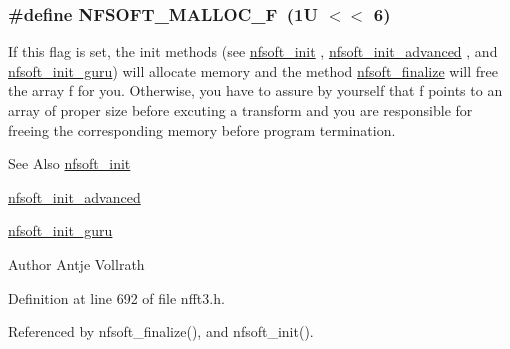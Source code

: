 \hypertarget{group__nfsoft_gac65bdc42b4c11296197dc991bbebbd12}{
\subsubsection[{N\-F\-S\-O\-F\-T\-\_\-\-M\-A\-L\-L\-O\-C\-\_\-\-F}]{\setlength{\rightskip}{0pt plus 5cm}\#define N\-F\-S\-O\-F\-T\-\_\-\-M\-A\-L\-L\-O\-C\-\_\-\-F~(1\-U $<$$<$ 6)}}\label{group__nfsoft_gac65bdc42b4c11296197dc991bbebbd12}
If this flag is set, the init methods (see \hyperlink{group__nfsoft_ga31c884458165fa204073c6c16c10775e}{nfsoft\-\_\-init} , \hyperlink{group__nfsoft_gaf4aec4ee2a2a5d56ca27c4f1a7f90b18}{nfsoft\-\_\-init\-\_\-advanced} , and \hyperlink{group__nfsoft_ga1c13cdd3f82f48fa41acdd313cdc2052}{nfsoft\-\_\-init\-\_\-guru}) will allocate memory and the method \hyperlink{group__nfsoft_ga30b5c6ae1ff496680f11ddcaad2d5a47}{nfsoft\-\_\-finalize} will free the array {\ttfamily f} for you. Otherwise, you have to assure by yourself that {\ttfamily f} points to an array of proper size before excuting a transform and you are responsible for freeing the corresponding memory before program termination.

\begin{DoxySeeAlso}{See Also}
\hyperlink{group__nfsoft_ga31c884458165fa204073c6c16c10775e}{nfsoft\-\_\-init} 

\hyperlink{group__nfsoft_gaf4aec4ee2a2a5d56ca27c4f1a7f90b18}{nfsoft\-\_\-init\-\_\-advanced} 

\hyperlink{group__nfsoft_ga1c13cdd3f82f48fa41acdd313cdc2052}{nfsoft\-\_\-init\-\_\-guru} 
\end{DoxySeeAlso}
\begin{DoxyAuthor}{Author}
Antje Vollrath 
\end{DoxyAuthor}


Definition at line 692 of file nfft3.\-h.



Referenced by nfsoft\-\_\-finalize(), and nfsoft\-\_\-init().

